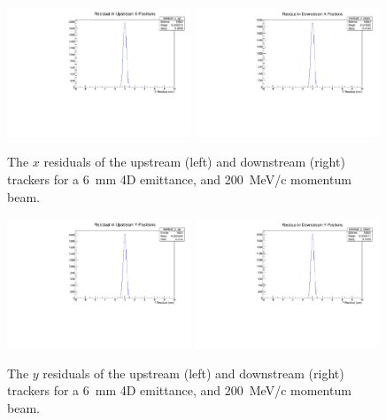   \begin{figure}[p]
    \begin{center}
      \includegraphics[width=0.49\textwidth, angle=0]{08-Performance/residual_x_up.pdf}
      \includegraphics[width=0.49\textwidth, angle=0]{08-Performance/residual_x_down.pdf}
      \caption{\label{fig:XResidKalman} The $x$ residuals of the upstream (left) and downstream (right) trackers for a 6~mm 4D emittance, and 200~MeV/c momentum beam.}
    \end{center}
  \end{figure}
  
    \begin{figure}[p]
    \begin{center}
      \includegraphics[width=0.49\textwidth, angle=0]{08-Performance/residual_y_up.pdf}
      \includegraphics[width=0.49\textwidth, angle=0]{08-Performance/residual_y_down.pdf}
      \caption{\label{fig:YResidKalman} The $y$ residuals of the upstream (left) and downstream (right) trackers for a 6~mm 4D emittance, and 200~MeV/c momentum beam.}
    \end{center}
  \end{figure}
  

